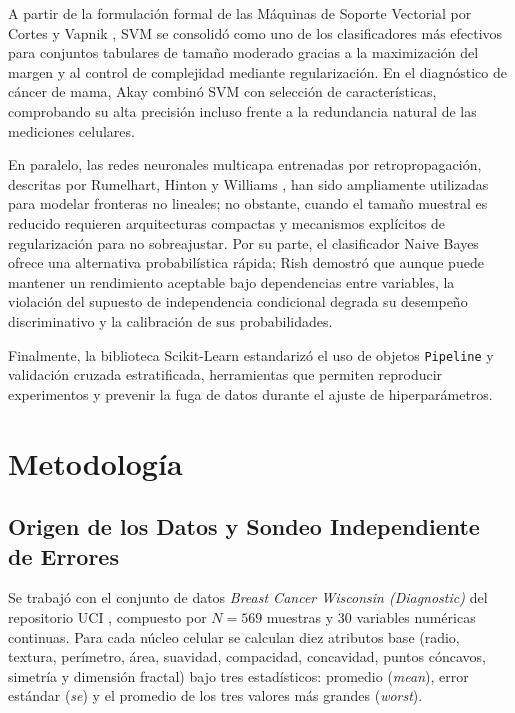 \documentclass[conference]{IEEEtran}
\begin{document}
A partir de la formulación formal de las Máquinas de Soporte Vectorial por Cortes y Vapnik \cite{cortes1995}, SVM se consolidó como uno de los clasificadores más efectivos para conjuntos tabulares de tamaño moderado gracias a la maximización del margen y al control de complejidad mediante regularización. En el diagnóstico de cáncer de mama, Akay \cite{akay2009} combinó SVM con selección de características, comprobando su alta precisión incluso frente a la redundancia natural de las mediciones celulares.

En paralelo, las redes neuronales multicapa entrenadas por retropropagación, descritas por Rumelhart, Hinton y Williams \cite{rumelhart1986}, han sido ampliamente utilizadas para modelar fronteras no lineales; no obstante, cuando el tamaño muestral es reducido requieren arquitecturas compactas y mecanismos explícitos de regularización para no sobreajustar. Por su parte, el clasificador Naive Bayes ofrece una alternativa probabilística rápida; Rish \cite{rish2001} demostró que aunque puede mantener un rendimiento aceptable bajo dependencias entre variables, la violación del supuesto de independencia condicional degrada su desempeño discriminativo y la calibración de sus probabilidades.

Finalmente, la biblioteca Scikit-Learn \cite{pedregosa2011} estandarizó el uso de objetos \texttt{Pipeline} y validación cruzada estratificada, herramientas que permiten reproducir experimentos y prevenir la fuga de datos durante el ajuste de hiperparámetros.

\section{Metodología}

\subsection{Origen de los Datos y Sondeo Independiente de Errores}

Se trabajó con el conjunto de datos \textit{Breast Cancer Wisconsin (Diagnostic)} del repositorio UCI \cite{street1993}, compuesto por $N = 569$ muestras y 30 variables numéricas continuas. Para cada núcleo celular se calculan diez atributos base (radio, textura, perímetro, área, suavidad, compacidad, concavidad, puntos cóncavos, simetría y dimensión fractal) bajo tres estadísticos: promedio (\textit{mean}), error estándar (\textit{se}) y el promedio de los tres valores más grandes (\textit{worst}).
\end{document}
